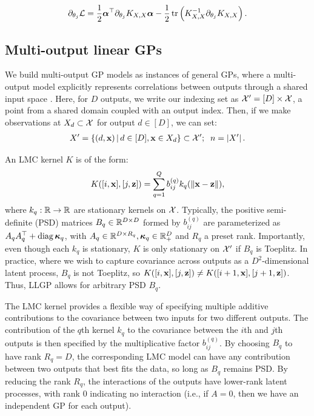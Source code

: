\documentclass[twoside]{article}
\begin{document}
\begin{align}
\partial_{\theta_j}\mathcal{L} = \frac{1}{2}{\boldsymbol\alpha}^\top\partial_{\theta_j}K_{X,X}{\boldsymbol\alpha} -\frac{1}{2}\operatorname{tr}\left({K_{X,X}^{-1}\partial_{\theta_j}K_{X,X}}\right).\label{llgradient}
\end{align}

\subsection{Multi-output linear GPs}

We build multi-output GP models as instances of general GPs, where a multi-output model explicitly represents correlations between outputs through a shared input space \citep{alvarez2012kernels}. Here, for $D$ outputs, we write our indexing set as $\mathcal{X}'=[D]\times \mathcal{X}$, a point from a shared domain coupled with an output index. Then, if we make observations at $X_d\subset\mathcal{X}$ for output $d\in[D]$, we can set:
\begin{align*}
X'=\left\{ (d, \textbf{x}) \,\middle|\, d\in[D],\textbf{x}\in X_d \right\}\subset{\mathcal{X}'};\;\; n=\left\vert{X'}\right\vert.
\end{align*}

An LMC kernel $K$ is of the form:
\begin{align}
K([i,\textbf{x}],[j,\textbf{z}])=\sum_{q=1}^Qb_{ij}^{(q)}k_q(\left\| \textbf{x}-\textbf{z} \right\|),\label{lmcpointwise}
\end{align} 
where $k_q:\mathbb{R}\rightarrow\mathbb{R}$ are stationary kernels on $\mathcal{X}$. Typically, the positive semi-definite (PSD) matrices $B_q\in\mathbb{R}^{D\times D}$ formed by $b_{ij}^{(q)}$ are parameterized as $A_qA_q^\top+\operatorname{diag}{\boldsymbol\kappa}_q$, with $A_q\in\mathbb{R}^{D\times R_q},{\boldsymbol\kappa}_q\in\mathbb{R}_+^D$ and $R_q$ a preset rank. Importantly, even though each $k_q$ is stationary, $K$ is only stationary on $\mathcal{X}'$ if $B_q$ is Toeplitz. In practice, where we wish to capture covariance across outputs as a $D^2$-dimensional latent process, $B_q$ is not Toeplitz, so $K([i,\textbf{x}],[j,\textbf{z}])\neq K([i+1,\textbf{x}],[j+1,\textbf{z}])$. Thus, LLGP allows for arbitrary PSD $B_q$.

The LMC kernel provides a flexible way of specifying multiple additive contributions to the covariance between two inputs for two different outputs. The contribution of the $q$th kernel $k_q$ to the covariance between the $i$th and $j$th outputs is then specified by the multiplicative factor $b_{ij}^{(q)}$. By choosing $B_q$ to have rank $R_q=D$, the corresponding LMC model can have any contribution between two outputs that best fits the data, so long as $B_q$ remains PSD. By reducing the rank $R_q$, the interactions of the outputs have lower-rank latent processes, with rank 0 indicating no interaction (i.e., if $A=0$, then we have an independent GP for each output).
\end{document}
